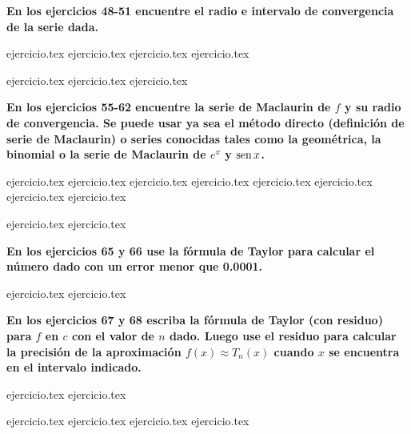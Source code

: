 \vspace{0.3cm}
\noindent\textbf{En los ejercicios 48-51 encuentre el radio e intervalo de convergencia de la serie dada.}
\begin{enumerate}
    \setcounter{enumi}{47}
    {ejercicio.tex}
{ejercicio.tex}
{ejercicio.tex}
{ejercicio.tex}
\end{enumerate}

\vspace{0.3cm}
\begin{enumerate}
    \setcounter{enumi}{51}
    {ejercicio.tex}
{ejercicio.tex}
{ejercicio.tex}
\end{enumerate}

\vspace{0.3cm}
\noindent\textbf{En los ejercicios 55-62 encuentre la serie de Maclaurin de $f$ y su radio de convergencia. Se puede usar ya sea el método directo (definición de serie de Maclaurin) o series conocidas tales como la geométrica, la binomial o la serie de Maclaurin de $e^x$ y $\operatorname{sen} x$.}
\begin{enumerate}
    \setcounter{enumi}{54}
    {ejercicio.tex}
{ejercicio.tex}
{ejercicio.tex}
{ejercicio.tex}
{ejercicio.tex}
{ejercicio.tex}
{ejercicio.tex}
{ejercicio.tex}
\end{enumerate}

\vspace{0.3cm}
\begin{enumerate}
    \setcounter{enumi}{62}
    {ejercicio.tex}
{ejercicio.tex}
\end{enumerate}

\vspace{0.3cm}
\noindent\textbf{En los ejercicios 65 y 66 use la fórmula de Taylor para calcular el número dado con un error menor que 0.0001.}
\begin{enumerate}
    \setcounter{enumi}{64}
    {ejercicio.tex}
{ejercicio.tex}
\end{enumerate}

\vspace{0.3cm}
\noindent\textbf{En los ejercicios 67 y 68 escriba la fórmula de Taylor (con residuo) para $f$ en $c$ con el valor de $n$ dado. Luego use el residuo para calcular la precisión de la aproximación $f(x) \approx T_n(x)$ cuando $x$ se encuentra en el intervalo indicado.}
\begin{enumerate}
    \setcounter{enumi}{66}
    {ejercicio.tex}
{ejercicio.tex}
\end{enumerate}

\vspace{0.3cm}
\begin{enumerate}
    \setcounter{enumi}{68}
    {ejercicio.tex}
{ejercicio.tex}
{ejercicio.tex}
{ejercicio.tex}
\end{enumerate}
